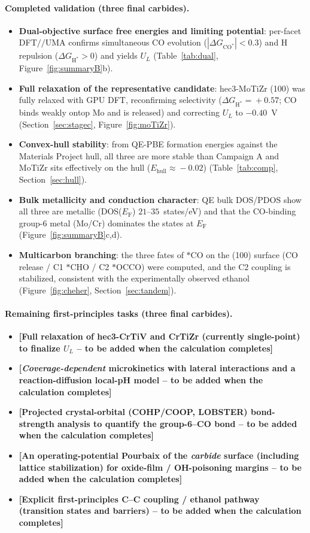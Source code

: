 \documentclass[11pt,a4paper]{report}
\newcommand{\tbc}[1]{\textcolor{blue!60!black}{\textbf{[#1 -- to be added when the calculation completes]}}}
\newcommand{\dGCO}{\Delta G_{\mathrm{CO^*}}}
\newcommand{\dGH}{\Delta G_{\mathrm{H^*}}}
\newcommand{\Ef}{E_\mathrm{F}}
\begin{document}
\paragraph{Completed validation (three final carbides).}
\begin{itemize}[nosep]
\item \textbf{Dual-objective surface free energies and limiting potential}: per-facet DFT$/\!/$UMA confirms simultaneous CO evolution
($|\dGCO|<0.3$) and H repulsion ($\dGH>0$) and yields $U_L$ (Table~\ref{tab:dual}, Figure~\ref{fig:summaryB}b).
\item \textbf{Full relaxation of the representative candidate}: hec3-MoTiZr (100) was fully relaxed with GPU DFT, reconfirming selectivity
($\dGH\!=\!+0.57$; CO binds weakly ontop Mo and is released) and correcting $U_L$ to $-0.40$~V (Section~\ref{sec:stagec}, Figure~\ref{fig:moTiZr}).
\item \textbf{Convex-hull stability}: from QE-PBE formation energies against the Materials Project hull, all three are more stable than Campaign A
and MoTiZr sits effectively on the hull ($E_{\mathrm{hull}}\!\approx\!-0.02$) (Table~\ref{tab:comp}, Section~\ref{sec:hull}).
\item \textbf{Bulk metallicity and conduction character}: QE bulk DOS/PDOS show all three are metallic (DOS($\Ef$) $21$--$35$~states/eV) and that
the CO-binding group-6 metal (Mo/Cr) dominates the states at $\Ef$ (Figure~\ref{fig:summaryB}c,d).
\item \textbf{Multicarbon branching}: the three fates of $*$CO on the (100) surface (CO release / C1 $*$CHO / C2 $*$OCCO) were computed, and the
C2 coupling is stabilized, consistent with the experimentally observed ethanol (Figure~\ref{fig:cheher}, Section~\ref{sec:tandem}).
\end{itemize}

\paragraph{Remaining first-principles tasks (three final carbides).}
\begin{itemize}[nosep]
\item \tbc{Full relaxation of hec3-CrTiV and CrTiZr (currently single-point) to finalize $U_L$}
\item \tbc{\emph{Coverage-dependent} microkinetics with lateral interactions and a reaction-diffusion local-pH model}
\item \tbc{Projected crystal-orbital (COHP/COOP, LOBSTER) bond-strength analysis to quantify the group-6--CO bond}
\item \tbc{An operating-potential Pourbaix of the \emph{carbide} surface (including lattice stabilization) for oxide-film / OH-poisoning margins}
\item \tbc{Explicit first-principles C--C coupling / ethanol pathway (transition states and barriers)}
\end{itemize}
\end{document}
